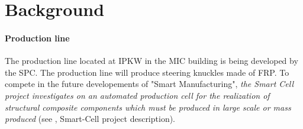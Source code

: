 \section{Background}

 

\paragraph{Production line}

The production line located at \ac{IPKW} in the \ac{MIC} building is being developed by the \ac{SPC}. The production line will produce steering knuckles made of \ac{FRP}. To compete in the future developements of "Smart Manufacturing", \textit{the Smart Cell  project investigates on an automated production cell for the realization of structural composite components which must be produced in large scale or mass produced} (see \cite{SPCWebsite}, Smart-Cell project description). 




